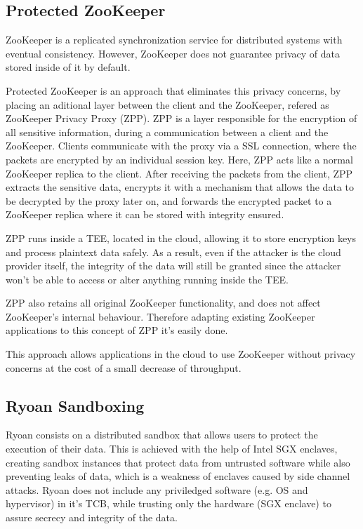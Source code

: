 \subsection{Protected ZooKeeper}

ZooKeeper \cite{zookeeper} is a replicated synchronization service for distributed systems with eventual consistency. However, ZooKeeper does not guarantee privacy of data stored inside of it by default.
 
Protected ZooKeeper \cite{protectedZooKeeper} is an approach that eliminates this privacy concerns, by placing an aditional layer between the client and the ZooKeeper, refered as ZooKeeper Privacy Proxy (ZPP). ZPP is a layer responsible for the encryption of all sensitive information, during a communication between a client and the ZooKeeper. 
Clients communicate with the proxy via a SSL connection, where the packets are encrypted by an individual session key. Here, ZPP acts like a normal ZooKeeper replica to the client. 
After receiving the packets from the client, ZPP extracts the sensitive data, encrypts it with a mechanism that allows the data to be decrypted by the proxy later on, and forwards the encrypted packet to a ZooKeeper replica where it can be stored with integrity ensured.
 
ZPP runs inside a TEE, located in the cloud, allowing it to store encryption keys and process plaintext data safely. As a result, even if the attacker is the cloud provider itself, the integrity of the data will still be granted since the attacker won't be able to access or alter anything running inside the TEE.

ZPP also retains all original ZooKeeper functionality, and does not affect ZooKeeper's internal behaviour. Therefore adapting existing ZooKeeper applications to this concept of ZPP it's easily done.

This approach allows applications in the cloud to use ZooKeeper without privacy concerns at the cost of a small decrease of throughput.

\subsection{Ryoan Sandboxing}

Ryoan \cite{ryoanPaper} consists on a distributed sandbox that allows users to protect the execution of their data. This is achieved with the help of Intel SGX \cite{intelSGX} \cite{sgxPaper} enclaves, creating sandbox instances that protect data from untrusted software while also preventing leaks of data, which is a weakness of enclaves caused by side channel attacks.
Ryoan does not include any priviledged software (e.g. OS and hypervisor) in it's TCB, while trusting only the hardware (SGX enclave) to assure secrecy and integrity of the data.

